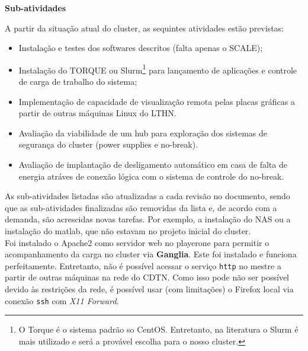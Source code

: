 \textbf{Sub-atividades}

A partir da situação atual do cluster, as sequintes atividades estão previstas:
\begin{itemize}
	\item[1] Instalação e testes dos softwares descritos (falta apenas o SCALE);
	\item[2] Instalação do TORQUE ou Slurm\footnote{O Torque é o sistema padrão so CentOS. Entretanto, na literatura o Slurm é mais utilizado e será a provável escolha para o nosso cluster.} para lançamento de aplicações e controle de 
	carga de trabalho do sistema;
	\item[4] Implementação de capacidade de visualização remota pelas placas gráficas a partir de outras máquinas Linux do LTHN.
	\item[5] Avaliação da viabilidade de um hub para exploração dos sistemas de segurança do cluster (power supplies e no-break).
	\item[6] Avaliação de implantação de desligamento automático em casa de falta de energia atráves de conexão lógica com o sistema de controle do no-break.
\end{itemize}

As sub-atividades listadas são atualizadas a cada revisão no documento, sendo que 
as sub-atividades finalizadas são removidas da lista e, de acordo com a demanda, 
são acrescidas novas tarefas. Por exemplo, a instalação do NAS ou a instalação do 
matlab, que não estavam no projeto inicial do cluster.\\

Foi instalado o Apache2 como servidor web no playerone para permitir o acompanhamento da carga no cluster via \textbf{Ganglia}. Este foi instalado 
e funciona perfeitamente. Entretanto, não é possível acessar o serviço \texttt{http} no mestre a partir de outras máquinas na rede do CDTN. Como isso 
pode não ser possível devido às restrições da rede, é possível usar (com limitações) o Firefox local via conexão \texttt{ssh} com \textit{X11 Forward}.\\


